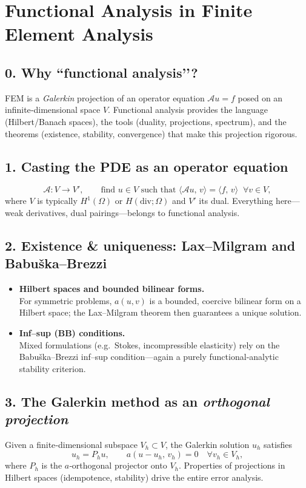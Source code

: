 \documentclass[12pt]{article}
\theoremstyle{definition} %
\theoremstyle{plain} %
\begin{document}
\section*{Functional Analysis in Finite Element Analysis}

\subsection*{0.  Why “functional analysis’’?}
FEM is a \emph{Galerkin} projection of an operator equation
\(
	\mathcal{A}u = f
\)
posed on an infinite‑dimensional space $V$.  
Functional analysis provides the language (Hilbert/Banach spaces),
the tools (duality, projections, spectrum), and the theorems
(existence, stability, convergence) that make this projection rigorous.

\subsection*{1.  Casting the PDE as an operator equation}
\[
	\mathcal{A}:V \longrightarrow V', 
	\qquad 
	\text{find }u\in V\text{ such that } \langle \mathcal{A}u,\,v\rangle = \langle f,\,v\rangle \;\;\forall v\in V ,
\]
where $V$ is typically $H^1(\Omega)$ or $H(\mathrm{div};\Omega)$ and
$V'$ its dual.  
Everything here—weak derivatives, dual pairings—belongs to functional
analysis.

\subsection*{2.  Existence \& uniqueness: Lax–Milgram and Babuška–Brezzi}
\begin{itemize}
  \item \textbf{Hilbert spaces and bounded bilinear forms.}\\
        For symmetric problems, $a(u,v)$ is a bounded, coercive
        bilinear form on a Hilbert space; the Lax–Milgram theorem then
        guarantees a unique solution.
  \item \textbf{Inf–sup (BB) conditions.}\\
        Mixed formulations (e.g.\ Stokes, incompressible elasticity)
        rely on the Babuška–Brezzi inf–sup condition—again a purely
        functional‑analytic stability criterion.
\end{itemize}

\subsection*{3.  The Galerkin method as an \emph{orthogonal projection}}
Given a finite‑dimensional subspace $V_h\subset V$,
the Galerkin solution $u_h$ satisfies
\[
	u_h = P_h u,
	\qquad
	a(u-u_h,\,v_h)=0\quad\forall v_h\in V_h,
\]
where $P_h$ is the $a$‑orthogonal projector onto $V_h$.  
Properties of projections in Hilbert spaces (idempotence, stability)
drive the entire error analysis.
\end{document}
